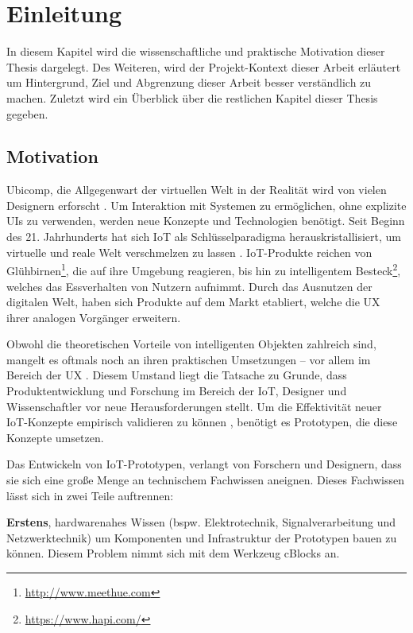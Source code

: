 \chapter{Einleitung}\label{sec:1_einleitung}
In diesem Kapitel wird die wissenschaftliche und praktische Motivation dieser Thesis dargelegt. Des Weiteren, wird der Projekt-Kontext dieser Arbeit erläutert um Hintergrund, Ziel und Abgrenzung dieser Arbeit besser verständlich zu machen. Zuletzt wird ein Überblick über die restlichen Kapitel dieser Thesis gegeben.


\section{Motivation}\label{sec:1_motivation}
\ac{Ubicomp}, die Allgegenwart der virtuellen Welt in der Realität wird von vielen Designern erforscht \cite{Kuniavsky.2010}. Um Interaktion mit Systemen zu ermöglichen, ohne explizite \acp{UI} zu verwenden, werden neue Konzepte und Technologien benötigt. Seit Beginn des 21. Jahrhunderts hat sich \ac{IoT} als Schlüsselparadigma herauskristallisiert, um virtuelle und reale Welt verschmelzen zu lassen \cite{Gubbi.2013}. \ac{IoT}-Produkte reichen von Glühbirnen\footnote{\url{http://www.meethue.com}}, die auf ihre Umgebung reagieren, bis hin zu intelligentem Besteck\footnote{\url{https://www.hapi.com/}}, welches das Essverhalten von Nutzern aufnimmt. Durch das Ausnutzen der digitalen Welt, haben sich Produkte auf dem Markt etabliert, welche die \ac{UX} ihrer analogen Vorgänger erweitern.

Obwohl die theoretischen Vorteile von intelligenten Objekten zahlreich sind, mangelt es oftmals noch an ihren praktischen Umsetzungen -- vor allem im Bereich der \ac{UX} \cite{Resnick.2013}. Diesem Umstand liegt die Tatsache zu Grunde, dass Produktentwicklung und Forschung im Bereich der \ac{IoT}, Designer und Wissenschaftler vor neue Herausforderungen stellt. Um die Effektivität neuer \ac{IoT}-Konzepte empirisch validieren zu können \cite{Robinson.2018}, benötigt es Prototypen, die diese Konzepte umsetzen. 

Das Entwickeln von \ac{IoT}-Prototypen, verlangt von Forschern und Designern, dass sie sich eine große Menge an technischem Fachwissen aneignen. Dieses Fachwissen lässt sich in zwei Teile auftrennen: 

\textbf{Erstens}, hardwarenahes Wissen (bspw. Elektrotechnik, Signalverarbeitung und Netzwerktechnik) um Komponenten und Infrastruktur der Prototypen bauen zu können. Diesem Problem nimmt sich \cite{weckbach2018cblocks} mit dem Werkzeug \acp{cBlock} an. 

